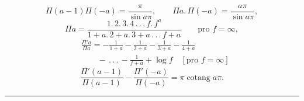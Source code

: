 \[
\Pi(a-1)\Pi(-a)=\frac\pi{\sin a\pi},\qquad \Pi a{.}\,\Pi(-a)=\frac{a\pi}{\sin a\pi},
\]
\[
\Pi a=\frac{1{.}\,2{.}\,3{.}\,4\,{.}\,{.}\,{.}\,f{.}\,f^a}{1+a{.}\,2+a{.}\,3+a\,{.}\,{.}\,{.}\,f+a}\qquad\text{pro }f=\infty,
\]
\[
\begin{aligned}
&\frac{\Pi'a}{\Pi a}=-\frac1{1+a}-\frac1{2+a}-\frac1{3+a}-\frac1{4+a}\\[.7em]
&\qquad-\,{.}\,{.}\,{.}\,-\frac1{f+a}+\log f\quad[\text{pro }f=\infty]
\end{aligned}
\]
\[
\frac{\Pi'(a-1)}{\Pi(a-1)}-\frac{\Pi'(-a)}{\Pi(-a)}=\pi\operatorname{cotang}a\pi.
\]
\begin{center}\rule{.2\textwidth}{.4pt}\end{center}
\clearpage
